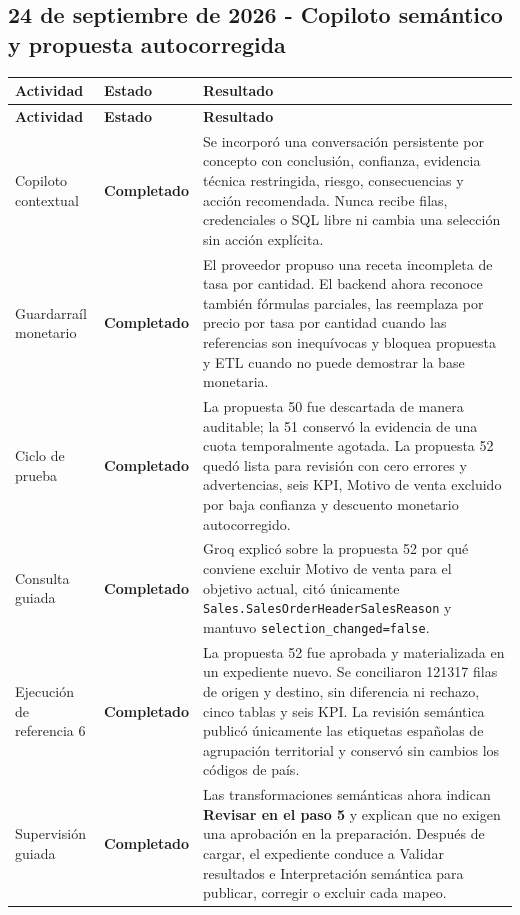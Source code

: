 \documentclass[11pt,letterpaper]{article}
\newcommand{\statusok}{\textcolor{deepgreen}{\textbf{Completado}}}
\newcommand{\file}[1]{\texttt{#1}}
\begin{document}
\subsection{24 de septiembre de 2026 - Copiloto semántico y propuesta autocorregida}

\begin{longtable}{@{}p{}p{}p{}@{}}
  \toprule
  \textbf{Actividad} & \textbf{Estado} & \textbf{Resultado} \\
  \midrule
  \endfirsthead
  \toprule
  \textbf{Actividad} & \textbf{Estado} & \textbf{Resultado} \\
  \midrule
  \endhead
  Copiloto contextual & \statusok & Se incorporó una conversación persistente por concepto con conclusión, confianza, evidencia técnica restringida, riesgo, consecuencias y acción recomendada. Nunca recibe filas, credenciales o SQL libre ni cambia una selección sin acción explícita. \\
  Guardarraíl monetario & \statusok & El proveedor propuso una receta incompleta de tasa por cantidad. El backend ahora reconoce también fórmulas parciales, las reemplaza por precio por tasa por cantidad cuando las referencias son inequívocas y bloquea propuesta y ETL cuando no puede demostrar la base monetaria. \\
  Ciclo de prueba & \statusok & La propuesta 50 fue descartada de manera auditable; la 51 conservó la evidencia de una cuota temporalmente agotada. La propuesta 52 quedó lista para revisión con cero errores y advertencias, seis KPI, Motivo de venta excluido por baja confianza y descuento monetario autocorregido. \\
  Consulta guiada & \statusok & Groq explicó sobre la propuesta 52 por qué conviene excluir Motivo de venta para el objetivo actual, citó únicamente \file{Sales.SalesOrderHeaderSalesReason} y mantuvo \file{selection\_changed=false}. \\
  Ejecución de referencia 6 & \statusok & La propuesta 52 fue aprobada y materializada en un expediente nuevo. Se conciliaron 121317 filas de origen y destino, sin diferencia ni rechazo, cinco tablas y seis KPI. La revisión semántica publicó únicamente las etiquetas españolas de agrupación territorial y conservó sin cambios los códigos de país. \\
  Supervisión guiada & \statusok & Las transformaciones semánticas ahora indican \textbf{Revisar en el paso 5} y explican que no exigen una aprobación en la preparación. Después de cargar, el expediente conduce a Validar resultados e Interpretación semántica para publicar, corregir o excluir cada mapeo. \\

\end{longtable}
\end{document}

